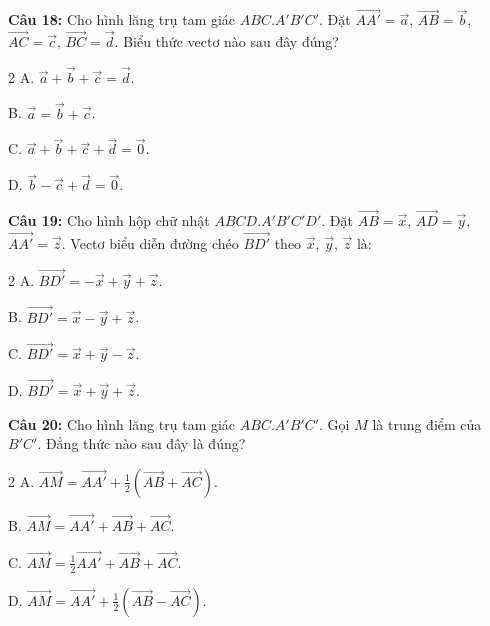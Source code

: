 \documentclass[12pt]{article}
\begin{document}
	\vspace{0.2cm}
	\noindent\textbf{Câu 18:} Cho hình lăng trụ tam giác $ABC.A'B'C'$. Đặt $\overrightarrow{AA'} = \vec{a}$, $\overrightarrow{AB} = \vec{b}$, $\overrightarrow{AC} = \vec{c}$, $\overrightarrow{BC} = \vec{d}$. Biểu thức vectơ nào sau đây đúng?
	\begin{multicols}{2}
		A. $\vec{a} + \vec{b} + \vec{c} = \vec{d}$. \par
		B. $\vec{a} = \vec{b} + \vec{c}$. \par
		C. $\vec{a} + \vec{b} + \vec{c} + \vec{d} = \vec{0}$. \par
		D. $\vec{b} - \vec{c} + \vec{d} = \vec{0}$.
	\end{multicols}
	
	\vspace{0.2cm}
	\noindent\textbf{Câu 19:} Cho hình hộp chữ nhật $ABCD.A'B'C'D'$. Đặt $\overrightarrow{AB} = \vec{x}$, $\overrightarrow{AD} = \vec{y}$, $\overrightarrow{AA'} = \vec{z}$. Vectơ biểu diễn đường chéo $\overrightarrow{BD'}$ theo $\vec{x}$, $\vec{y}$, $\vec{z}$ là:
	\begin{multicols}{2}
		A. $\overrightarrow{BD'} = -\vec{x} + \vec{y} + \vec{z}$. \par
		B. $\overrightarrow{BD'} = \vec{x} - \vec{y} + \vec{z}$. \par
		C. $\overrightarrow{BD'} = \vec{x} + \vec{y} - \vec{z}$. \par
		D. $\overrightarrow{BD'} = \vec{x} + \vec{y} + \vec{z}$.
	\end{multicols}
	
	\vspace{0.2cm}
	\noindent\textbf{Câu 20:} Cho hình lăng trụ tam giác $ABC.A'B'C'$. Gọi $M$ là trung điểm của $B'C'$. Đẳng thức nào sau đây là đúng?
	\begin{multicols}{2}
		A. $\overrightarrow{AM} = \overrightarrow{AA'} + \frac{1}{2}(\overrightarrow{AB} + \overrightarrow{AC})$. \par
		B. $\overrightarrow{AM} = \overrightarrow{AA'} + \overrightarrow{AB} + \overrightarrow{AC}$. \par
		C. $\overrightarrow{AM} = \frac{1}{2}\overrightarrow{AA'} + \overrightarrow{AB} + \overrightarrow{AC}$. \par
		D. $\overrightarrow{AM} = \overrightarrow{AA'} + \frac{1}{2}(\overrightarrow{AB} - \overrightarrow{AC})$.
	\end{multicols}
	
\end{document}
